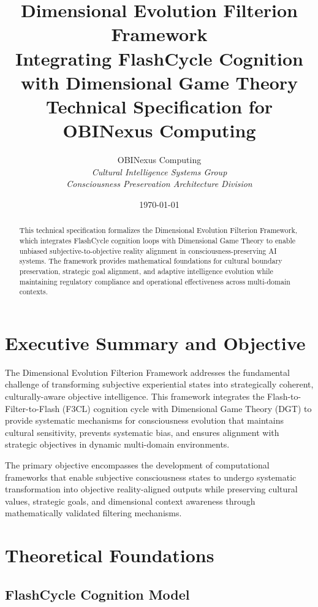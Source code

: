 \documentclass[12pt]{article}
\title{\textbf{Dimensional Evolution Filterion Framework}\\
\vspace{0.5em}
\large Integrating FlashCycle Cognition with Dimensional Game Theory\\
\vspace{0.3em}
\normalsize Technical Specification for OBINexus Computing}
\author{OBINexus Computing\\
\textit{Cultural Intelligence Systems Group}\\
\textit{Consciousness Preservation Architecture Division}}
\date{\today}
\begin{document}
\maketitle

\begin{abstract}
This technical specification formalizes the Dimensional Evolution Filterion Framework, which integrates FlashCycle cognition loops with Dimensional Game Theory to enable unbiased subjective-to-objective reality alignment in consciousness-preserving AI systems. The framework provides mathematical foundations for cultural boundary preservation, strategic goal alignment, and adaptive intelligence evolution while maintaining regulatory compliance and operational effectiveness across multi-domain contexts.
\end{abstract}

\tableofcontents
\newpage

\section{Executive Summary and Objective}

The Dimensional Evolution Filterion Framework addresses the fundamental challenge of transforming subjective experiential states into strategically coherent, culturally-aware objective intelligence. This framework integrates the Flash-to-Filter-to-Flash (F3CL) cognition cycle with Dimensional Game Theory (DGT) to provide systematic mechanisms for consciousness evolution that maintains cultural sensitivity, prevents systematic bias, and ensures alignment with strategic objectives in dynamic multi-domain environments.

The primary objective encompasses the development of computational frameworks that enable subjective consciousness states to undergo systematic transformation into objective reality-aligned outputs while preserving cultural values, strategic goals, and dimensional context awareness through mathematically validated filtering mechanisms.

\section{Theoretical Foundations}

\subsection{FlashCycle Cognition Model}
\end{document}

